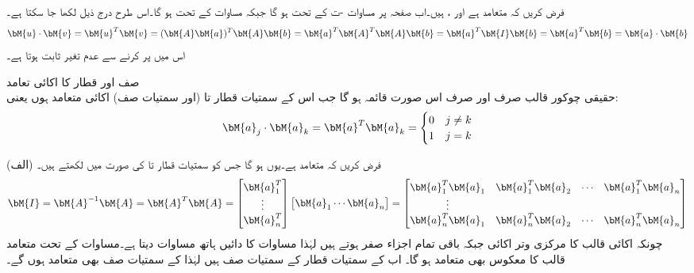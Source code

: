 فرض کریں کہ  متعامد ہے اور  ،  ہیں۔اب صفحہ  پر مساوات -ت کے تحت  ہو گا جبکہ مساوات  کے تحت  ہو گا۔اس طرح درج ذیل لکھا جا سکتا ہے۔
\begin{align}
\bM{u}\cdot \bM{v}=\bM{u}^T\bM{v}=(\bM{A}\bM{a})^T\bM{A}\bM{b}=\bM{a}^T\bM{A}^T\bM{A}\bM{b}=\bM{a}^T\bM{I}\bM{b}=\bM{a}^T\bM{b}=\bM{a}\cdot\bM{b}
\end{align} 
اس میں  پر کرنے سے  عدم تغیر ثابت ہوتا ہے۔

\quad صف اور قطار کا اکائی تعامد\\
حقیقی چوکور قالب صرف اور صرف اس صورت قائمہ ہو گا جب اس کے سمتیات قطار  تا  (اور سمتیات صف) اکائی متعامد  ہوں یعنی:
\begin{align}\label{مساوات_امتیازی_معیاری_قائمیت_الف}
\bM{a}_j\cdot\bM{a}_k=\bM{a}^T\bM{a}_k=
\begin{cases}
0& j\ne k\\
1&j=k
\end{cases}
\end{align}

(الف) فرض کریں کہ  متعامد ہے۔یوں  ہو گا جس کو سمتیات قطار  تا  کی صورت میں لکھتے ہیں۔
\begin{align}\label{مساوات_امتیازی_معیاری_قائمیت_ب}
\bM{I}=\bM{A}^{-1}\bM{A}=\bM{A}^T\bM{A}=\begin{bmatrix}\bM{a}_1^T\\  \vdots \\ \bM{a}_n^T  \end{bmatrix}\begin{bmatrix} \bM{a}_1 \cdots \bM{a}_n \end{bmatrix}=
\begin{bmatrix} \bM{a}_1^T\bM{a}_1&\bM{a}_1^T\bM{a}_2&\cdots&\bM{a}_1^T\bM{a}_n\\  \vdots \\ 
\bM{a}_n^T\bM{a}_1&\bM{a}_n^T\bM{a}_2&\cdots&\bM{a}_n^T\bM{a}_n \end{bmatrix}
\end{align}
چونکہ  اکائی قالب  کا مرکزی وتر اکائی جبکہ باقی تمام اجزاء صفر ہوتے ہیں لہٰذا مساوات  کا دائیں ہاتھ  مساوات  دیتا ہے۔مساوات  کے تحت متعامد قالب کا معکوس بھی متعامد ہو گا۔ اب  کے سمتیات قطار  کے سمتیات صف ہیں لہٰذا  کے سمتیات صف بھی متعامد ہوں گے۔ 

